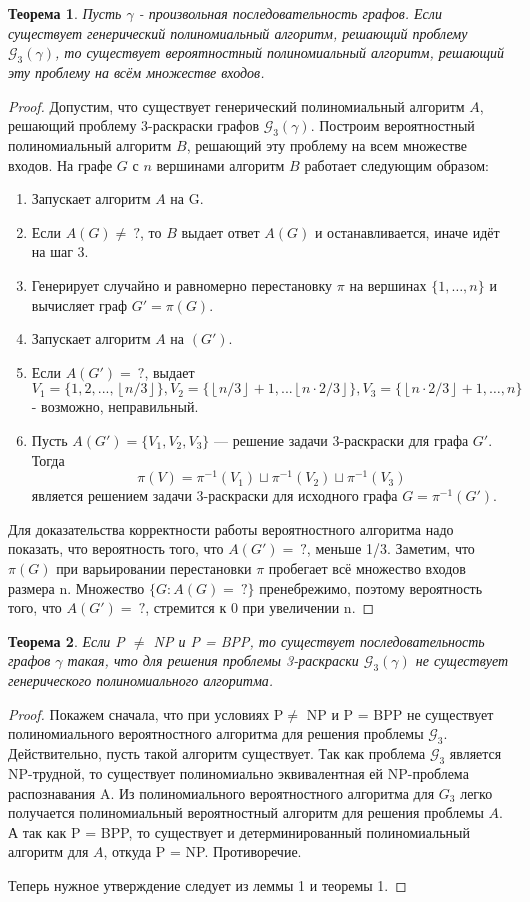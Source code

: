 \documentclass[a4paper, 12pt]{article}
\newtheorem{theorem}{Теорема}
\theoremstyle{definition}
\theoremstyle{remark}
\def\lc{\left\lfloor}
\def\rc{\right\rfloor}
\begin{document}
\begin{theorem}
	Пусть $\gamma$ - произвольная последовательность графов. Если существует генерический полиномиальный алгоритм, решающий проблему $\mathcal
 G_3(\gamma)$, то существует вероятностный полиномиальный алгоритм, решающий эту проблему на всём множестве входов.
\end{theorem}
\begin{proof}
	Допустим, что существует генерический полиномиальный алгоритм $A$, решающий проблему 3-раскраски графов $\mathcal G_3(\gamma)$.
	Построим вероятностный полиномиальный алгоритм $B$, решающий эту проблему на всем множестве входов. На графе $G$ с $n$ вершинами алгоритм $B$ работает следующим образом:

	\begin{enumerate}
		\item Запускает алгоритм $A$ на G.
		\item Если $A(G)\neq\  ?
$, то $B$ выдает ответ $A(G)$ и останавливается, иначе идёт на шаг 3.
		\item Генерирует случайно и равномерно перестановку $\pi$ на вершинах $\{1,\dots,n\}$ и вычисляет граф $G' = \pi(G)$.
		\item Запускает алгоритм $A$ на $(G')$.
		\item Если $A(G') =\  ?
$, выдает $
			      V_1 = \{1, 2, ..., \lc n/3 \rc\},
			      V_2 = \{\lc n/3\rc +1, ... \lc n\cdot 2/3\rc \},
			      V_3 = \{\lc n\cdot 2/3 \rc +1 , \dots, n\}$ - возможно, неправильный.
		\item Пусть $A(G') = \{V_1, V_2, V_3\}$ --- решение задачи 3-раскраски для графа $G'$. Тогда
		      \[\pi(V) = \pi^{-1}(V_1) \sqcup \pi^{-1} (V_2) \sqcup \pi^{-1} (V_3)\]
		      является решением задачи 3-раскраски для исходного графа $G = \pi^{-1} (G')$.
	\end{enumerate}
	Для доказательства корректности работы вероятностного алгоритма надо показать,
	что вероятность того, что $A(G') =\  ?
$, меньше 1/3. Заметим, что $\pi (G)$ при варьировании
	перестановки $\pi$ пробегает всё множество входов размера n. Множество $\{G : A(G) =\  ?
\}$
	пренебрежимо, поэтому вероятность того, что $A(G'
		) =\  ?
$, стремится к 0 при увеличении n.
\end{proof}
\begin{theorem}
	Если P $\neq$ NP и P = BPP, то существует последовательность графов $\gamma$ такая, что для решения проблемы 3-раскраски $\mathcal
 G_3(\gamma)$ не существует генерического полиномиального алгоритма.
\end{theorem}
\begin{proof}
	Покажем сначала, что при условиях P$\neq$ NP и P = BPP не существует полиномиального вероятностного алгоритма для решения проблемы $\mathcal
 G_3$. Действительно, пусть такой алгоритм существует. Так как проблема $\mathcal
 G_3$ является NP-трудной, то существует полиномиально эквивалентная ей NP-проблема распознавания A. Из полиномиального вероятностного алгоритма для $G_3$ легко получается полиномиальный вероятностный алгоритм для решения проблемы $A$. А так как P = BPP, то существует и детерминированный полиномиальный алгоритм для $A$, откуда P = NP. Противоречие.

	Теперь нужное утверждение следует из леммы 1 и теоремы 1.
\end{proof}
\end{document}
